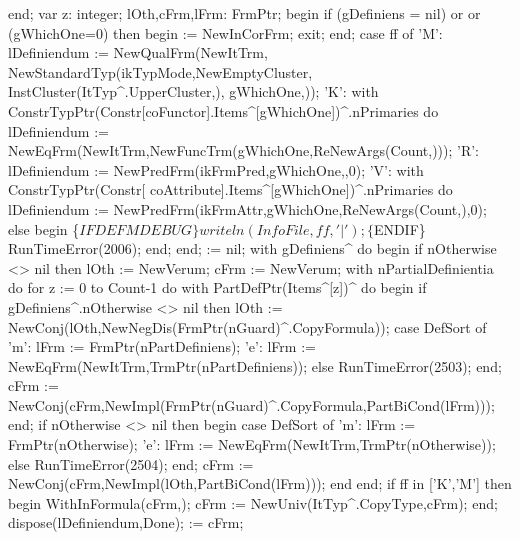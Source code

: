    end;
var
   z: integer;
   lOth,cFrm,lFrm: FrmPtr;
begin
   if (gDefiniens = nil) or  or (gWhichOne=0) then
   begin
       := NewInCorFrm;
      exit;
   end;
   case ff of
      'M':
         lDefiniendum := 
         NewQualFrm(NewItTrm,
                    NewStandardTyp(ikTypMode,NewEmptyCluster,
                                   InstCluster(ItTyp^.UpperCluster,),
                                   gWhichOne,));
      'K':
         with ConstrTypPtr(Constr[coFunctor].Items^[gWhichOne])^.nPrimaries do
         lDefiniendum := NewEqFrm(NewItTrm,NewFuncTrm(gWhichOne,ReNewArgs(Count,)));
      'R': lDefiniendum := NewPredFrm(ikFrmPred,gWhichOne,,0);
      'V':
         with ConstrTypPtr(Constr[ coAttribute].Items^[gWhichOne])^.nPrimaries do
         lDefiniendum := NewPredFrm(ikFrmAttr,gWhichOne,ReNewArgs(Count,),0);
      else
      begin
         \{$IFDEF MDEBUG\}
         writeln(InfoFile,ff,'|');
         \{$ENDIF\}
         RunTimeError(2006);
      end;
   end;
    := nil;
   with gDefiniens^ do
   begin
      if nOtherwise <> nil then lOth := NewVerum;
      cFrm := NewVerum;
      with nPartialDefinientia do
         for z := 0 to Count-1 do 
            with PartDefPtr(Items^[z])^ do
         begin
            if gDefiniens^.nOtherwise <> nil then
               lOth := NewConj(lOth,NewNegDis(FrmPtr(nGuard)^.CopyFormula));
            case DefSort of
               'm': lFrm := FrmPtr(nPartDefiniens);
               'e': lFrm := NewEqFrm(NewItTrm,TrmPtr(nPartDefiniens));
               else RunTimeError(2503);
            end;
            cFrm := NewConj(cFrm,NewImpl(FrmPtr(nGuard)^.CopyFormula,PartBiCond(lFrm)));
         end;
      if nOtherwise <> nil then
      begin
         case DefSort of
            'm': lFrm := FrmPtr(nOtherwise);
            'e': lFrm := NewEqFrm(NewItTrm,TrmPtr(nOtherwise));
            else RunTimeError(2504);
         end;
         cFrm := NewConj(cFrm,NewImpl(lOth,PartBiCond(lFrm)));
      end
   end;
   if ff in ['K','M'] then
   begin
      WithInFormula(cFrm,);
      cFrm := NewUniv(ItTyp^.CopyType,cFrm);
   end;
   dispose(lDefiniendum,Done);
    := cFrm;
